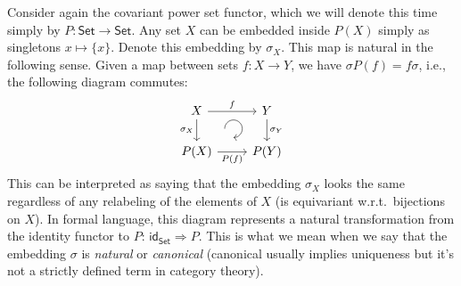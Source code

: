 \begin{example}
    Consider again the covariant power set functor, which we will denote this time simply by $P:\mathsf{Set}\to \mathsf{Set}$. Any set $X$ can be embedded inside $P(X)$ simply as singletons $x\mapsto \{x\}$. Denote this embedding by $\sigma_X$. This map is natural in the following sense. Given a map between sets $f:X\to Y$, we have $\sigma P(f)=f \sigma$, i.e., the following diagram commutes:
    \[\begin{tikzcd}[every matrix/.append style={name=m},execute at end picture={\draw [<-] ([xshift=-2.7em,yshift=1mm]m-2-2.north) arc[start angle=-90,delta angle=270,radius=0.25cm];}]
   X \arrow[r,"f"]\arrow[d,swap,"\sigma_X"]& Y\arrow[d,"\sigma_Y"] \\
   P(X)\arrow[r,swap,"P(f)"]& P(Y)
\end{tikzcd}\]
This can be interpreted as saying that the embedding $\sigma_X$ looks the same regardless of any relabeling of the elements of $X$ (is equivariant w.r.t.\ bijections on $X$). In formal language, this diagram represents a natural transformation from the identity functor to $P$: $\mathsf{id}_{\mathsf{Set}}\Longrightarrow P$. This is what we mean when we say that the embedding $\sigma$ is \emph{natural} or \emph{canonical} (canonical usually implies uniqueness but it's not a strictly defined term in category theory).
\end{example}
%
